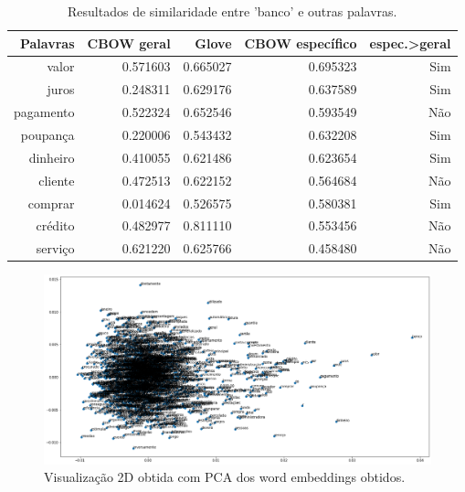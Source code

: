\documentclass[a4paper,11pt,oneside,onecolumn,final]{article}
\begin{document}
\begin{table}[ht]
\centering
\begin{tabular}{|r|r|r|r|r|}
\hline
\textbf{Palavras} & \textbf{CBOW geral} & \textbf{Glove} & \textbf{CBOW específico} & \textbf{espec.\textgreater{}geral} \\ \hline
valor             & 0.571603      & 0.665027       & 0.695323     & Sim                           \\ \hline
juros             & 0.248311      & 0.629176       & 0.637589     & Sim                           \\ \hline
pagamento         & 0.522324      & 0.652546       & 0.593549     & Não                          \\ \hline
poupança          & 0.220006      & 0.543432       & 0.632208     & Sim                           \\ \hline
dinheiro          & 0.410055      & 0.621486       & 0.623654     & Sim                           \\ \hline
cliente           & 0.472513      & 0.622152       & 0.564684     & Não                          \\ \hline
comprar           & 0.014624      & 0.526575       & 0.580381     & Sim                           \\ \hline
crédito           & 0.482977      & 0.811110       & 0.553456     & Não                          \\ \hline
serviço           & 0.621220      & 0.625766       & 0.458480     & Não                          \\ \hline
\end{tabular}
\caption{Resultados de similaridade entre 'banco' e outras palavras.}
\label{tabela}
\end{table}


\begin{figure}[ht]
    \includegraphics[width=\textwidth]{figura.png} %
    \caption{Visualização 2D obtida com PCA dos word embeddings obtidos.}
    \label{figura}
\end{figure}
\end{document}
